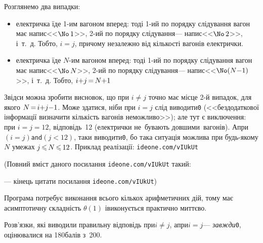 \documentclass[14pt,a4paper]{extarticle}
\def\dib#1{\,#1\discretionary{}{\mbox{$#1$}}{}\,}
\renewcommand{\baselinestretch}{1.3125}
\begin{document}
\Tutorial	Розглянемо два випадки: 

\begin{itemize}
\item
електричка їде \mbox{1-им} вагоном вперед: тоді 
\mbox{1-ий} по порядку слідування вагон має напис\nolinebreak[2] <<$\No\,1$>>, 
\mbox{2-ий} по порядку слідування\nolinebreak[3] --- напис\nolinebreak[2] <<$\No\,2$>>, 
і~т.~д. Тобто, ${i{=}j}$, причому незалежно від кількості вагонів електрички.
\item
електричка їде \mbox{$N$-им} вагоном вперед: тоді 
\mbox{1-ий} по порядку слідування вагон має напис\nolinebreak[2] <<$\No\,N$>>, 
\mbox{2-ий} по порядку слідування\nolinebreak[3] --- напис\nolinebreak[2] <<$\No(N{-}1)$>>, 
і~т.~д. Тобто, ${i{+}j}\dib{{=}}{N{+}1}$
\end{itemize}

Звідси можна зробити висновок, що при $i{\neq}j$ точно має місце \mbox{2-й} випадок, для якого $N\dib{{=}}{i{+}j{-}1}$. Може здатися, ніби при $i{=}j$ слід виводити\nolinebreak[3] \texttt{0} (<<без\nolinebreak[1] додаткової інформації визначити кількість вагонів неможливо>>); але тут є виключення: при $i{=}j{=}12$, відповідь~12 (електрички не~бувають довшими~вагонів). А\nolinebreak[3] при\nolinebreak[1] $({i{=}j})$\nolinebreak[3] \texttt{and}\nolinebreak[2] $({j{<}12})$, таки виводити\nolinebreak[3] \texttt{0}, бо така ситуація можлива при будь-якому\nolinebreak[3] $N$ 
у\nolinebreak[3] межах $j\dib{{\<}}N\dib{{\<}}12$.
Приклад реалізації: 
\verb"ideone.com/vIUkUt"


{\color{green}\begin{small}

\renewcommand{\baselinestretch}{0.875}

(Повний вміст даного посилання \verb"ideone.com/vIUkUt" такий:

--- кінець цитати посилання \verb"ideone.com/vIUkUt")

\end{small}}




Програма потребує виконання всього кількох арифметичних дій, тому має асимптотичну складність $\theta(1)$ і\nolinebreak[3] виконується практично миттєво.

Розв'язки, які виводили правильну відповідь при\nolinebreak[2] $i{\neq}j$, а\nolinebreak[3] при\nolinebreak[2]  $i{=}j$\nolinebreak[3] --- \emph{завжди}\nolinebreak[3] \texttt{0}, оцінювалися на 180\nolinebreak[3] балів з~200.
\end{document}
